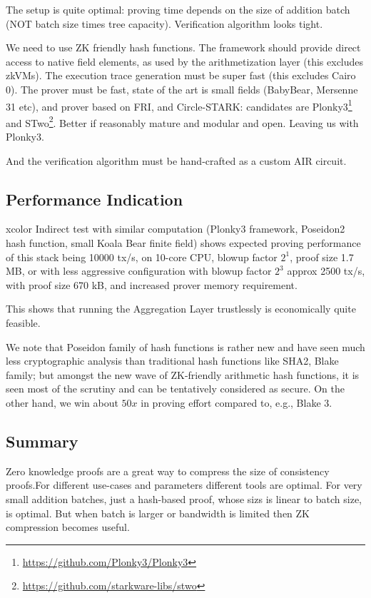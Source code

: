 \documentclass{llncs}
\begin{document}
The setup is quite optimal: proving time depends on the size of addition batch (NOT batch size times tree capacity). Verification algorithm looks tight.

We need to use ZK friendly hash functions. The framework should provide direct access to native field elements, as used by the arithmetization layer (this excludes zkVMs). The execution trace generation must be super fast (this excludes Cairo 0). The prover must be fast, state of the art is small fields (BabyBear, Mersenne 31 etc), and prover based on FRI, and Circle-STARK: candidates are Plonky3\footnote{\url{https://github.com/Plonky3/Plonky3}} and STwo\footnote{\url{https://github.com/starkware-libs/stwo}}. Better if reasonably mature and modular and open. Leaving us with Plonky3.

And the verification algorithm must be hand-crafted as a custom AIR circuit.

\subsection{Performance Indication}
xcolor
Indirect test with similar computation (Plonky3 framework, Poseidon2 hash function, small Koala Bear finite field) shows expected proving performance of this stack being 10000 tx/s, on 10-core CPU, blowup factor $2^1$, proof size 1.7 MB, or with less aggressive configuration with blowup factor $2^3$ approx 2500 tx/s, with proof size 670 kB, and increased prover memory requirement.

This shows that running the Aggregation Layer trustlessly is economically quite feasible.

We note that Poseidon family of hash functions is rather new and have seen much less cryptographic analysis than traditional hash functions like SHA2, Blake family; but amongst the new wave of ZK-friendly arithmetic hash functions, it is seen most of the scrutiny and can be tentatively considered as secure. On the other hand, we win about $50x$ in proving effort compared to, e.g., Blake 3.


\subsection{Summary}

Zero knowledge proofs are a great way to compress the size of consistency proofs.For different use-cases and parameters different tools are optimal. For very small addition batches, just a hash-based proof, whose sizs is linear to batch size, is optimal. But when batch is larger or bandwidth is limited then ZK compression becomes useful.
\end{document}
